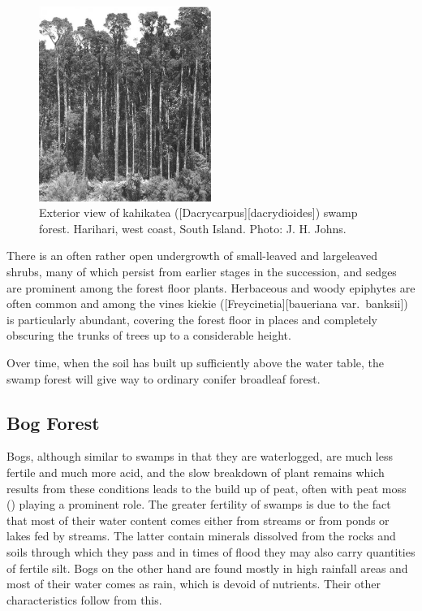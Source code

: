 \begin{figure}
	\includegraphics[width=0.5\textwidth]{graphics/figure67kahikatea.jpg}
	\centering
	\caption[Exterior view of kahikatea swamp forest]{Exterior view of kahikatea ([Dacrycarpus][dacrydioides]) swamp forest.
	Harihari, west coast, South Island.
	Photo: J. H. Johns.}%
	\label{fig:67kahikatea}
\end{figure}

There is an often rather open undergrowth of small-leaved and largeleaved shrubs, many of which persist from earlier stages in the succession, and sedges are prominent among the forest floor plants.
Herbaceous and woody epiphytes are often common and among the vines kiekie ([Freycinetia][baueriana var.\ banksii]) is particularly abundant, covering the forest floor in places and completely obscuring the trunks of trees up to a considerable height.

Over time, when the soil has built up sufficiently above the water table, the swamp forest will give way to ordinary conifer broadleaf forest.

\subsection{Bog Forest}

Bogs, although similar to swamps in that they are waterlogged, are much less fertile and much more acid, and the slow breakdown of plant remains which results from these conditions leads to the build up of peat, often with peat moss () playing a prominent role.
The greater fertility of swamps is due to the fact that most of their water content comes either from streams or from ponds or lakes fed by streams.
The latter contain minerals dissolved from the rocks and soils through which they pass and in times of flood they may also carry quantities of fertile silt.
Bogs on the other hand are found mostly in high rainfall areas and most of their water comes as rain, which is devoid of nutrients.
Their other characteristics follow from this.

